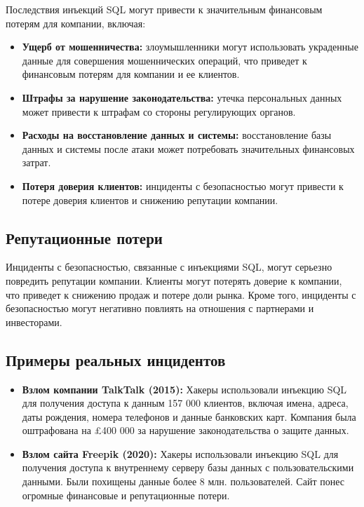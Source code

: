 \documentclass[a4paper,12pt]{diplom}
\begin{document}
	 Последствия инъекций SQL могут привести к значительным финансовым потерям для компании, включая:
	 
	 \begin{itemize}
	 	\item \textbf{Ущерб от мошенничества:} злоумышленники могут использовать украденные данные для совершения мошеннических операций, что приведет к финансовым потерям для компании и ее клиентов. 
	 	\item \textbf{Штрафы за нарушение законодательства:} утечка персональных данных может привести к штрафам со стороны регулирующих органов. 
	 	\item \textbf{Расходы на восстановление данных и системы:} восстановление базы данных и системы после атаки может потребовать значительных финансовых затрат. 
	 	\item \textbf{Потеря доверия клиентов:} инциденты с безопасностью могут привести к потере доверия клиентов и снижению репутации компании. 
	 \end{itemize}
	 
	 \subsection{Репутационные потери}
	 
	 Инциденты с безопасностью, связанные с инъекциями SQL, могут серьезно повредить репутации компании.  Клиенты могут потерять доверие к компании, что приведет к снижению продаж и потере доли рынка.  Кроме того, инциденты с безопасностью могут негативно повлиять на отношения с партнерами и инвесторами. 
	 
	 \subsection{Примеры реальных инцидентов}
	 
	 \begin{itemize}
	 	\item \textbf{Взлом компании TalkTalk (2015):} Хакеры использовали инъекцию SQL для получения доступа к данным 157 000 клиентов, включая имена, адреса, даты рождения, номера телефонов и данные банковских карт. Компания была оштрафована на £400 000 за нарушение законодательства о защите данных.
	 	\item \textbf{Взлом сайта Freepik (2020): } Хакеры использовали инъекцию SQL для получения доступа к внутреннему серверу базы данных с пользовательскими данными. Были похищены данные более 8 млн. пользователей. Сайт понес огромные финансовые и репутационные потери. 
	 \end{itemize}
	 
\end{document}
